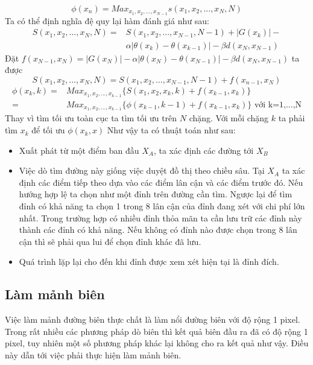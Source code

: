 \documentclass[14pt,oneside,a4paper]{extreport}
\begin{document}
\begin{equation*}
\phi(x_n)=Max_{x_1,x_2,...,x_{N-1}} s(x_1,x_2,..., x_N,N)
\end{equation*}
Ta có thể định nghĩa đệ quy lại hàm đánh giá như sau:
\begin{equation*}
\begin{split}
S(x_1,x_2,...,x_N,N)=&S(x_1,x_2,...,x_{N-1},N-1)+ |G(x_k)|-\\&
\alpha|\theta(x_k)-\theta(x_{k-1})|-\beta d(x_N,x_{N-1})
\end{split}
\end{equation*}
Đặt $f(x_{N-1},x_{N})=|G(x_N)|-\alpha|\theta(x_N)-\theta(x_{N-1})|-\beta d(x_N,x_{N-1})$  ta được
\begin{equation}
 S(x_1,x_2,...,x_N,N)=S(x_1,x_2,...,x_{N-1},N-1)+f(x_{n-1},x_{N})
\end{equation}
\begin{equation*}
\begin{split}
\phi(x_k,k)=&Max_{x_1,x_2,...,x_{k-1}}\{S(x_1, x_2, x_k,k)+f(x_{k-1},x_{k})\}\\=&Max_{x_1,x_2,...,x_{k-1}}\{\phi(x_{k-1},k-1)+f(x_{k-1},x_{k})\} \text{ với k=1,...,N}
\end{split}
\end{equation*}
Thay vì tìm tối ưu toàn cục ta tìm tối ưu trên $N$ chặng. Với mỗi chặng $k$ ta phải tìm $x_k$ để tối ưu $\phi(x_k,x)$
Như vậy ta có thuật toán như sau:
\begin{itemize}
\item Xuất phát từ một điểm ban đầu $X_A$, ta xác định các đường tới $X_B$
\item Việc dò tìm đường này giống việc duyệt đồ thị theo chiều sâu. Tại $X_A$ ta xác định các điểm tiếp theo dựa vào các điểm lân cận và các điểm trước đó. Nếu hướng hợp lệ ta chọn như một đỉnh trên đường cần tìm. Ngược lại để tìm đỉnh có khả năng ta chọn 1 trong 8 lân cận của đỉnh đang xét với chi phí lớn nhất. Trong trường hợp có nhiều đỉnh thỏa mãn ta cần lưu trữ các đỉnh này thành các đỉnh có khả năng. Nếu không có đỉnh nào được chọn trong 8 lân cận thì  sẽ phải qua lui để chọn đỉnh khác đã lưu.
\item Quá trình lặp lại cho đến khi đỉnh được xem xét hiện tại là đỉnh đích.
\end{itemize}
\subsection{Làm mảnh biên}
Việc làm mảnh đường biên thực chất là làm nổi đường biên với độ rộng 1 pixel. Trong rất nhiều các phương pháp dò biên thì kết quả biên đầu ra đã có độ rộng 1 pixel, tuy nhiên một số phương pháp khác lại không cho ra kết quả như vậy. Điều này dẫn tới việc phải thực hiện làm mảnh biên.
\end{document}

